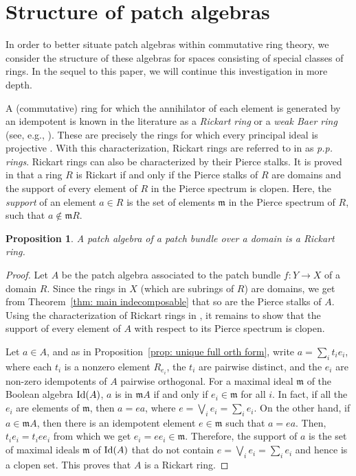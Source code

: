 \documentclass[11pt]{amsart}
\def\m{{\mathfrak m}} %
\newtheorem{proposition}[theorem]{Proposition}
\theoremstyle{definition}
\def\ff{\mathfrak}
\def\Id{\mbox{\rm Id}}
\begin{document}
 
\section{Structure of patch algebras}\label{sec: 7 structure of patch algebras}


In order to better situate  patch algebras within commutative ring theory,  we consider the structure of these algebras for spaces consisting of special classes of rings. In the sequel to this paper, we will continue this investigation in more depth. 

 A (commutative) ring for which the annihilator of each element is generated by an idempotent is known in the literature as a {\it Rickart ring} \cite[Definition 7.45]{Lam99} or a {\it weak Baer ring} (see, e.g., \cite{BDMG11}). These are precisely the rings for which every principal ideal is projective \cite[Proposition~7.48]{Lam99}. With this characterization, Rickart rings are referred to in \cite{Bergman} as {\it p.p. rings}. Rickart rings can also be characterized by their Pierce stalks. It is proved in  \cite[Lemma 3.1]{Bergman} that a ring $R$ is Rickart if and only if the 
Pierce stalks of $R$ are domains and the support of every element of $R$ in the Pierce spectrum is clopen.  Here, the {\it support} of an element $a\in R$ is the set of elements $\m$ in the Pierce spectrum of $R$, such that $a\not \in \m R$.

 \begin{proposition}\label{prop: Rickart} A patch algebra of a patch bundle over a domain is a Rickart ring. 
 \end{proposition} 

 \begin{proof} Let $A$ be the patch algebra associated to the patch bundle $f:Y \rightarrow X$ of a domain $R$. Since the rings in $X$ (which are subrings of $R$) are domains, we get from Theorem~\ref{thm: main indecomposable} that so are the Pierce stalks of $A$. Using the characterization of Rickart rings in \cite[Lemma 3.1]{Bergman}, it remains to show that the support of every element of $A$ with respect to its Pierce spectrum is clopen.  
 
 Let $a \in A$, and as in Proposition~\ref{prop: unique full orth form}, write $a =\sum_i t_ie_i$, where each $t_i$ is a nonzero element $ R_{e_i}$, the $t_i$ are pairwise distinct, and the $e_i$ are non-zero idempotents of $A$ pairwise orthogonal. For a maximal ideal $\ff m$ of the Boolean algebra $\Id(A)$,  $a$ is in $\ff m A$ if and only if $e_i \in \m$ for all $i$. In fact, if all the $e_i$ are elements of $\m$, then $a=e a$, where $e=\bigvee_i e_i=\sum_i e_i$. On the other hand, if $a\in \m A$, then there is an idempotent element $e\in \m$ such that $a=ea$. Then, $t_i e_i= t_i e e_i$ from which we get $e_i=e e_i\in \m$. Therefore, the support of $a$ is the set of maximal ideals $\ff m$ of $\Id(A)$ that do not contain $e=\bigvee_i e_i=\sum_i e_i$ and hence is a clopen set. This proves that $A$  is a Rickart ring. 
 \end{proof}
\end{document}
